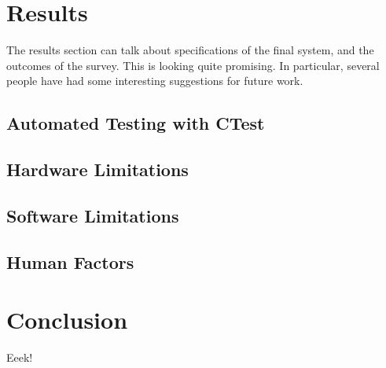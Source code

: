 \documentclass[MSc,paper=a4,pagesize=auto]{icldt}
\begin{document}
\chapter{Results}
The results section can talk about specifications of the final system, and the outcomes of the survey. This is looking quite promising. In particular, several people have had some interesting suggestions for future work. 

\section{Automated Testing with CTest}
\section{Hardware Limitations}
\section{Software Limitations}
\section{Human Factors}


\chapter{Conclusion}
Eeek!

	
\end{document}

